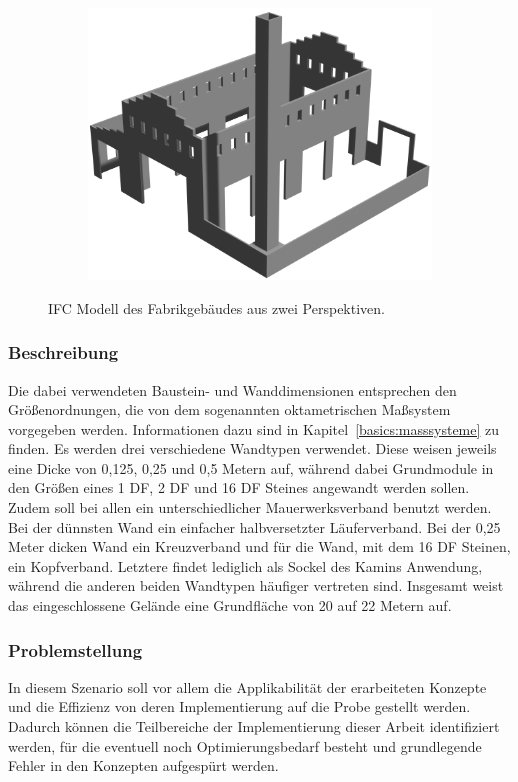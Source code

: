 \begin{figure}[hb!]
\begin{subfigure}[b]{0.49\columnwidth}
    \includegraphics[width=\columnwidth]{fig/scenario3_render_ifc2.png}
  \end{subfigure}
  \caption{IFC Modell des Fabrikgebäudes aus zwei Perspektiven.}\label{fig:scenarios:Scenario3 Gebaeudeplan}
\end{figure}

\subsubsection*{Beschreibung}
Die dabei verwendeten Baustein- und Wanddimensionen entsprechen den Größenordnungen, die von dem sogenannten oktametrischen Maßsystem vorgegeben werden.
Informationen dazu sind in Kapitel~\ref{basics:masssysteme} zu finden.
Es werden drei verschiedene Wandtypen verwendet.
Diese weisen jeweils eine Dicke von 0,125, 0,25 und 0,5 Metern auf, während dabei Grundmodule in den Größen eines 1 DF, 2 DF und 16 DF Steines angewandt werden sollen.
Zudem soll bei allen ein unterschiedlicher Mauerwerksverband benutzt werden.
Bei der dünnsten Wand ein einfacher halbversetzter Läuferverband.
Bei der 0,25 Meter dicken Wand ein Kreuzverband und für die Wand, mit dem 16 DF Steinen, ein Kopfverband.
Letztere findet lediglich als Sockel des Kamins Anwendung, während die anderen beiden Wandtypen häufiger vertreten sind.
Insgesamt weist das eingeschlossene Gelände eine Grundfläche von 20 auf 22 Metern auf.

\subsubsection*{Problemstellung}
In diesem Szenario soll vor allem die Applikabilität der erarbeiteten Konzepte und die Effizienz von deren Implementierung auf die Probe gestellt werden.
Dadurch können die Teilbereiche der Implementierung dieser Arbeit identifiziert werden, für die eventuell noch Optimierungsbedarf besteht und grundlegende Fehler in den Konzepten aufgespürt werden.


